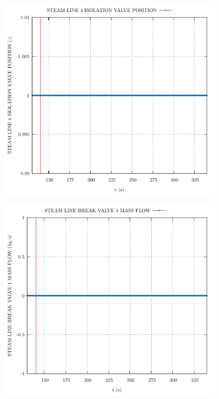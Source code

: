 \documentclass{article}
\begin{document}
\begin{multicols}{2}
\begin{figure}[H]
\end{figure}
\begin{figure}[H]
\centering
\includegraphics[width=\linewidth]{./graphs/STEAM LINE 4 ISOLATION VALVE POSITION_comp.pdf}
\end{figure}
\begin{figure}[H]
\centering
\includegraphics[width=\linewidth]{./graphs/STEAM LINE BREAK VALVE 1 MASS FLOW_comp.pdf}

\end{figure}
\end{multicols}
\end{document}
